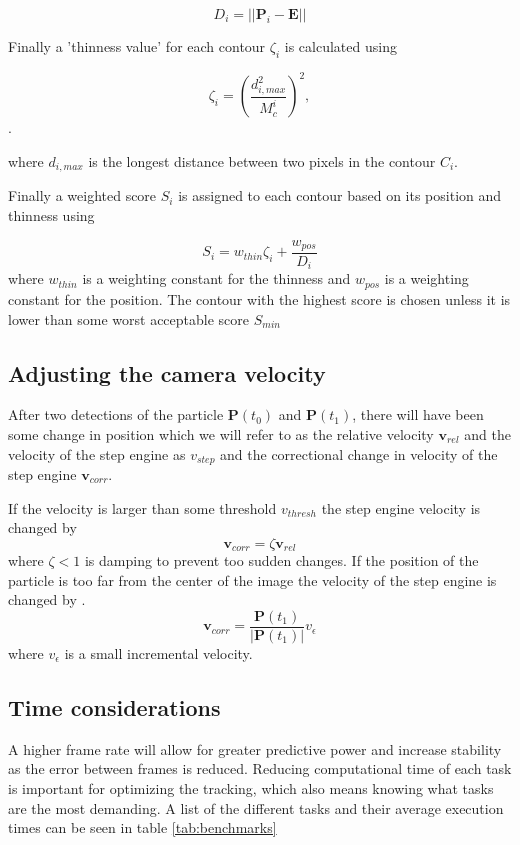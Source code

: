 \[
D_i = \left|\left|\mathbf{P}_i - \mathbf{E}\right|\right|
\]

Finally a 'thinness value' for each contour $\zeta_i$ is calculated using

\begin{equation}\label{eq:thinness}
\zeta_i =  \left(\frac{d_{i, max}^2}{M_c^i}\right)^2,
\end{equation}. 

where $d_{i,max}$ is the longest distance between two pixels in the contour $C_i$.

Finally a weighted score $S_i$ is assigned to each contour based on its position and thinness using

\begin{equation}
S_i = w_{thin}\zeta_i + \frac{w_{pos}}{D_i}
\end{equation}
\noindent where $w_{thin}$ is a weighting constant for the thinness and $w_{pos}$ is a weighting constant for the position. The contour with the highest score is chosen unless it is lower than some worst acceptable score $S_{min}$

\subsection{Adjusting the camera velocity}
After two detections of the particle $\mathbf{P}(t_0)$ and $\mathbf{P}(t_1)$, there will have been some change in position which we will refer to as the relative velocity $\mathbf{v}_{rel}$ and the velocity of the step engine as $v_{step}$ and the correctional change in velocity of the step engine $\mathbf{v}_{corr}$.

If the velocity is larger than some threshold $v_{thresh}$ the step engine velocity is changed by
\[
\mathbf{v}_{corr} = \zeta\mathbf{v}_{rel}
\]
where $\zeta < 1$ is damping to prevent too sudden changes. If the position of the particle is too far from the center of the image the velocity of the step engine is changed by .
\[
\mathbf{v}_{corr} = \frac{\mathbf{P}(t_1)}{\left|\mathbf{P}(t_1)\right|}v_{\epsilon}
\] 
where $v_{\epsilon}$ is a small incremental velocity.


\subsection{Time considerations}\label{sec:time considerations}
A higher frame rate will allow for greater predictive power and increase stability as the error between frames is 
reduced. Reducing computational time of each task is important for optimizing the tracking, which also means knowing 
what tasks are the most demanding. A list of the different tasks and their average execution times can be seen in table 
\ref{tab:benchmarks}


